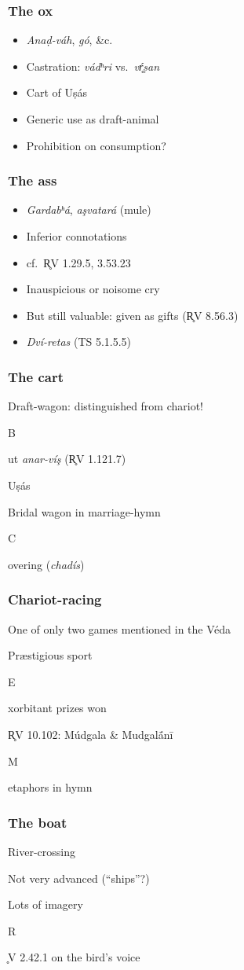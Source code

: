 \documentclass[pdf]{beamer}
\newcommand{\Subitem}[1]{{\setlength\itemindent{12pt} \item[-] #1}}
\begin{document}
\begin{frame} \frametitle{The ox}
\begin{itemize}
	\item {\textit{Anaḍ-váh}}, \textit{gó}, \&c.
	\item Castration: \textit{vádʰri} vs.~\textit{vŕ̥ṣan}
	\item Cart of Uṣás
	\item Generic use as draft-animal
	\item Prohibition on consumption?
\end{itemize}
\end{frame}

\begin{frame} \frametitle{The ass}
\begin{itemize}
	\item \textit{Gardabʰá}, \textit{aşvatará} (mule)
	\item Inferior connotations
	\item cf.~R̥V 1.29.5, 3.53.23
	\item Inauspicious or noisome cry
	\item But still valuable: given as gifts (R̥V 8.56.3)
	\item \textit{Dví-retas} (TS 5.1.5.5)
\end{itemize}
\end{frame}

\begin{frame} \frametitle{The cart}
\begin{itemize}
	\item Draft-wagon: distinguished from chariot!
	\Subitem But \textit{anar-víş} (R̥V 1.121.7)
	\item Uṣás
	\item Bridal wagon in marriage-hymn
	\Subitem Covering (\textit{chadís})
\end{itemize}
\end{frame}

\begin{frame} \frametitle{Chariot-racing}
\begin{itemize}
	\item One of only two games mentioned in the Véda
	\item Præstigious sport
	\Subitem Exorbitant prizes won
	\item R̥V 10.102: Múdgala \& Mudgalā́nī
	\Subitem Metaphors in hymn
\end{itemize}
\end{frame}

\begin{frame} \frametitle{The boat}
\begin{itemize}
	\item River-crossing
	\item Not very advanced (``ships''?)
	\item Lots of imagery
	\Subitem R̥V 2.42.1 on the bird's voice
\end{itemize}
\end{frame}
\end{document}
